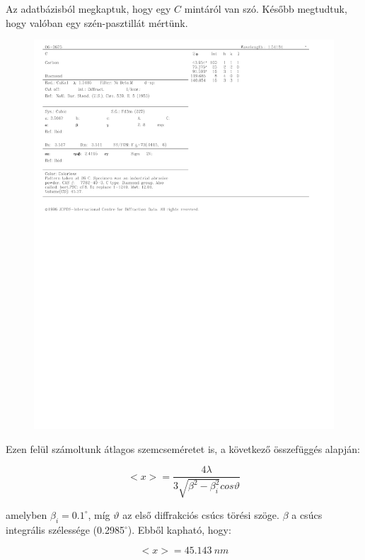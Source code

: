\documentclass[a4paper,12pt]{article}
\begin{document}
\par Az adatbázisból megkaptuk, hogy egy $C$ mintáról van szó. Később megtudtuk, hogy valóban egy szén-pasztillát mértünk.

\begin{figure}[H]
\centering
\includegraphics[width=.88\textwidth]{./maad.pdf}
\end{figure}

\par Ezen felül számoltunk átlagos szemcseméretet is, a következő összefüggés alapján:

\begin{equation*}
\Big<x\Big> = \frac{4\lambda}{3\sqrt{\beta^{2} - \beta^{2}_{i}}cos\vartheta}
\end{equation*}

\par amelyben $\beta_{i} = 0.1^{\circ}$, míg $\vartheta$ az első diffrakciós csúcs törési szöge. $\beta$ a csúcs integrális szélessége (0.2985$^{\circ}$). Ebből kapható, hogy:

\begin{equation*}
\Big<x\Big> = 45.143 ~nm
\end{equation*}
\end{document}
